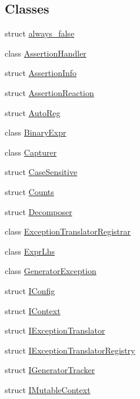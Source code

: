 \subsection*{Classes}
\begin{DoxyCompactItemize}
\item 
struct \mbox{\hyperlink{struct_catch_1_1always__false}{always\+\_\+false}}
\item 
class \mbox{\hyperlink{class_catch_1_1_assertion_handler}{Assertion\+Handler}}
\item 
struct \mbox{\hyperlink{struct_catch_1_1_assertion_info}{Assertion\+Info}}
\item 
struct \mbox{\hyperlink{struct_catch_1_1_assertion_reaction}{Assertion\+Reaction}}
\item 
struct \mbox{\hyperlink{struct_catch_1_1_auto_reg}{Auto\+Reg}}
\item 
class \mbox{\hyperlink{class_catch_1_1_binary_expr}{Binary\+Expr}}
\item 
class \mbox{\hyperlink{class_catch_1_1_capturer}{Capturer}}
\item 
struct \mbox{\hyperlink{struct_catch_1_1_case_sensitive}{Case\+Sensitive}}
\item 
struct \mbox{\hyperlink{struct_catch_1_1_counts}{Counts}}
\item 
struct \mbox{\hyperlink{struct_catch_1_1_decomposer}{Decomposer}}
\item 
class \mbox{\hyperlink{class_catch_1_1_exception_translator_registrar}{Exception\+Translator\+Registrar}}
\item 
class \mbox{\hyperlink{class_catch_1_1_expr_lhs}{Expr\+Lhs}}
\item 
class \mbox{\hyperlink{class_catch_1_1_generator_exception}{Generator\+Exception}}
\item 
struct \mbox{\hyperlink{struct_catch_1_1_i_config}{I\+Config}}
\item 
struct \mbox{\hyperlink{struct_catch_1_1_i_context}{I\+Context}}
\item 
struct \mbox{\hyperlink{struct_catch_1_1_i_exception_translator}{I\+Exception\+Translator}}
\item 
struct \mbox{\hyperlink{struct_catch_1_1_i_exception_translator_registry}{I\+Exception\+Translator\+Registry}}
\item 
struct \mbox{\hyperlink{struct_catch_1_1_i_generator_tracker}{I\+Generator\+Tracker}}
\item 
struct \mbox{\hyperlink{struct_catch_1_1_i_mutable_context}{I\+Mutable\+Context}}
\item 

\end{DoxyCompactItemize}
